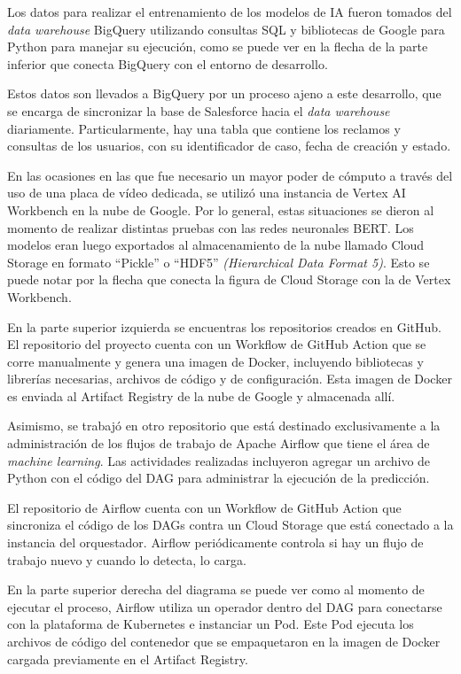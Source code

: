 Los datos para realizar el entrenamiento de los modelos de IA fueron tomados del \textit{data warehouse} BigQuery utilizando consultas SQL y bibliotecas de Google para Python para manejar su ejecución, como se puede ver en la flecha de la parte inferior que conecta BigQuery con el entorno de desarrollo.

Estos datos son llevados a BigQuery por un proceso ajeno a este desarrollo, que se encarga de sincronizar la base de Salesforce hacia el \textit{data warehouse} diariamente. Particularmente, hay una tabla que contiene los reclamos y consultas de los usuarios, con su identificador de caso, fecha de creación y estado.

En las ocasiones en las que fue necesario un mayor poder de cómputo a través del uso de una placa de vídeo dedicada, se utilizó una instancia de Vertex AI Workbench en la nube de Google. Por lo general, estas situaciones se dieron al momento de realizar distintas pruebas con las redes neuronales BERT. Los modelos eran luego exportados al almacenamiento de la nube llamado Cloud Storage en formato ``Pickle'' o ``HDF5'' \textit{(Hierarchical Data Format 5)}. Esto se puede notar por la flecha que conecta la figura de Cloud Storage con la de Vertex Workbench.

En la parte superior izquierda se encuentras los repositorios creados en GitHub. El repositorio del proyecto cuenta con un Workflow de GitHub Action que se corre manualmente y genera una imagen de Docker, incluyendo bibliotecas y librerías necesarias, archivos de código y de configuración. Esta imagen de Docker es enviada al Artifact Registry de la nube de Google y almacenada allí.

Asimismo, se trabajó en otro repositorio que está destinado exclusivamente a la administración de los flujos de trabajo de Apache Airflow que tiene el área de \textit{machine learning}. Las actividades realizadas incluyeron agregar un archivo de Python con el código del DAG para administrar la ejecución de la predicción.

El repositorio de Airflow cuenta con un Workflow de GitHub Action que sincroniza el código de los DAGs contra un Cloud Storage que está conectado a la instancia del orquestador. Airflow periódicamente controla si hay un flujo de trabajo nuevo y cuando lo detecta, lo carga.

En la parte superior derecha del diagrama se puede ver como al momento de ejecutar el proceso, Airflow utiliza un operador dentro del DAG para conectarse con la plataforma de Kubernetes e instanciar un Pod. Este Pod ejecuta los archivos de código del contenedor que se empaquetaron en la imagen de Docker cargada previamente en el Artifact Registry.

